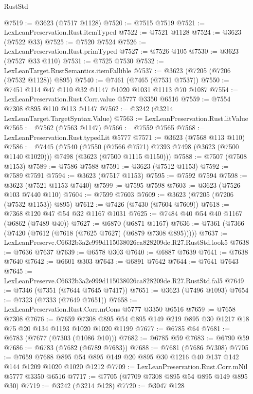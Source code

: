 \begin{lexlean}{RustStd}
\begin{coremodule}
@7519 := @3623 (@7517 @1128)
@7520 := @7515 @7519
@7521 := LexLeanPreservation.Rust.itemTyped
@7522 := @7521 @1128
@7524 := @3623 (@7522 @33)
@7525 := @7520 @7524
@7526 := LexLeanPreservation.Rust.primTyped
@7527 := @7526 @105
@7530 := @3623 (@7527 @33 @110)
@7531 := @7525 @7530
@7532 := LexLeanTarget.RustSemantics.itemFallible
@7537 := @3623 (@7205 (@7206 (@7532 @1128)) @895)
@7540 := @7461 (@7465 (@7531 @7537))
@7550 := @7451 @114 @47 @110 @32 @1147 @1020 @1031 @1113 @70 @1087
@7554 := LexLeanPreservation.Rust.Corr.value @5777 @3350 @6516
@7559 := @7554 @7308 @895 @110 @113 @1147
@7562 := @3242 (@3214 LexLeanTarget.TargetSyntax.Value)
@7563 := LexLeanPreservation.Rust.litValue
@7565 := @7562 (@7563 @1147)
@7566 := @7559 @7565
@7568 := LexLeanPreservation.Rust.typedLit @5777
@7571 := @3623 (@7568 @113 @110)
@7586 := @7445
    (@7540
      (@7550 (@7566 @7571) @7393 @7498 (@3623 (@7500 @1140 @1020)))
      @7498
      (@3623 (@7500 @1115 @1150)))
@7588 := @7507 (@7508 @1153)
@7589 := @7586 @7588
@7591 := @3623 (@7512 @1153)
@7592 := @7589 @7591
@7594 := @3623 (@7517 @1153)
@7595 := @7592 @7594
@7598 := @3623 (@7521 @1153 @7440)
@7599 := @7595 @7598
@7603 := @3623 (@7526 @103 @7440 @110)
@7604 := @7599 @7603
@7609 := @3623 (@7205 (@7206 (@7532 @1153)) @895)
@7612 := @7426 (@7430 (@7604 @7609))
@7618 := @7368 @120 @47 @54 @32 @1167 @1031
@7625 := @7484 @40 @54 @40 @1167 (@6862 (@7489 @40))
@7627 := @6870 (@6871 @1167)
@7636 := @7361 (@7366 (@7420 (@7612 (@7618 (@7625 @7627) (@6879 @7308 @895)))))
@7637 := LexLeanPreserve.C6632b3a2e999d115038026ca828209de.R27.RustStd.look5
@7638 := @7636 @7637
@7639 := @6578 @303
@7640 := @6887 @7639
@7641 := @7638 @7640
@7642 := @6601 @303
@7643 := @6891 @7642
@7644 := @7641 @7643
@7645 := LexLeanPreserve.C6632b3a2e999d115038026ca828209de.R27.RustStd.fal5
@7649 := @7346 (@7351 (@7644 @7645 @7417))
@7651 := @3623 (@7496 @1093)
@7654 := @7323 (@7333 (@7649 @7651))
@7658 := LexLeanPreservation.Rust.Corr.mCons @5777 @3350 @6516
@7659 := @7658 @7308
@7676 := @7659 @7308 @895 @54 @895 @149 @219 @895 @30 @1217 @18 @75 @20 @134 @1193 @1020 @1020 @1199
@7677 := @6785 @64
@7681 := @6783 (@7677 (@7303 (@1086 @10)))
@7682 := @6785 @59
@7683 := @6790 @59
@7686 := @6783 (@7682 (@6789 @7683))
@7688 := @7681 (@7686 @7308)
@7705 := @7659
    @7688
    @895
    @54
    @895
    @149
    @20
    @895
    @30
    @1216
    @40
    @137
    @142
    @144
    @1209
    @1020
    @1020
    @1212
@7709 := LexLeanPreservation.Rust.Corr.mNil @5777 @3350 @6516
@7717 := @7705 (@7709 @7308 @895 @54 @895 @149 @895 @30)
@7719 := @3242 (@3214 @128)
@7720 := @3047 @128

\end{coremodule}
\end{lexlean}
